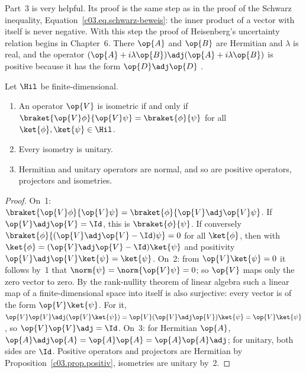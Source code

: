 Part~3 is very helpful. Its proof is the same step as in the proof of the Schwarz inequality,
Equation~\eqref{c03.eq.schwarz-beweis}: the inner product of a vector with itself is never
negative. With this step the proof of Heisenberg's uncertainty relation begins in Chapter~6.
There $\op{A}$ and $\op{B}$ are Hermitian and $\lambda$ is real, and the operator
$(\op{A} + i\lambda\op{B})\adj(\op{A} + i\lambda\op{B})$ is positive because it has the form
$\op{D}\adj\op{D}$ .

\begin{proposition}\label{c03.prop.isometrie}
  Let $\Hil$ be finite-dimensional.
  \begin{enumerate}
    \item An operator $\op{V}$ is isometric if and only if
      $\braket{\op{V}\phi}{\op{V}\psi} = \braket{\phi}{\psi}$ for all
      $\ket{\phi}, \ket{\psi} \in \Hil$.
    \item Every isometry is unitary.
    \item Hermitian and unitary operators are normal, and so are positive operators, projectors
      and isometries.
  \end{enumerate}
\end{proposition}
\begin{proof}
  On~1: $\braket{\op{V}\phi}{\op{V}\psi} = \braket{\phi}{\op{V}\adj\op{V}\psi}$. If
  $\op{V}\adj\op{V} = \Id$, this is $\braket{\phi}{\psi}$. If conversely
  $\braket{\phi}{(\op{V}\adj\op{V} - \Id)\psi} = 0$ for all $\ket{\phi}$, then with
  $\ket{\phi} = (\op{V}\adj\op{V} - \Id)\ket{\psi}$ and positivity
  $\op{V}\adj\op{V}\ket{\psi} = \ket{\psi}$. On~2: from $\op{V}\ket{\psi} = 0$ it follows by~1
  that $\norm{\psi} = \norm{\op{V}\psi} = 0$; so $\op{V}$ maps only the zero vector to zero. By
  the rank-nullity theorem of linear algebra such a linear map of a finite-dimensional space
  into itself is also surjective: every vector is of the form $\op{V}\ket{\psi}$. For it,
  $\op{V}\op{V}\adj(\op{V}\ket{\psi}) = \op{V}(\op{V}\adj\op{V})\ket{\psi} = \op{V}\ket{\psi}$,
  so $\op{V}\op{V}\adj = \Id$. On~3: for Hermitian $\op{A}$,
  $\op{A}\adj\op{A} = \op{A}\op{A} = \op{A}\op{A}\adj$; for unitary, both sides are $\Id$.
  Positive operators and projectors are Hermitian by Proposition~\ref{c03.prop.positiv},
  isometries are unitary by~2.
\end{proof}

